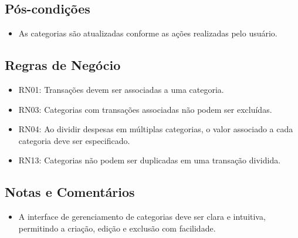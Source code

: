 \subsection*{Pós-condições}
\begin{addmargin}[1.5cm]{0cm}
    \begin{itemize}
        \item As categorias são atualizadas conforme as ações realizadas pelo usuário.
    \end{itemize}
\end{addmargin}

\subsection*{Regras de Negócio}
\begin{addmargin}[1.5cm]{0cm}
    \begin{itemize}
        \item RN01: Transações devem ser associadas a uma categoria.
        \item RN03: Categorias com transações associadas não podem ser excluídas.
        \item RN04: Ao dividir despesas em múltiplas categorias, o valor associado a cada categoria deve ser especificado.
        \item RN13: Categorias não podem ser duplicadas em uma transação dividida.
    \end{itemize}
\end{addmargin}

\subsection*{Notas e Comentários}
\begin{addmargin}[1.5cm]{0cm}
    \begin{itemize}
        \item A interface de gerenciamento de categorias deve ser clara e intuitiva, permitindo a criação, edição e exclusão com facilidade.
    \end{itemize}
\end{addmargin}
